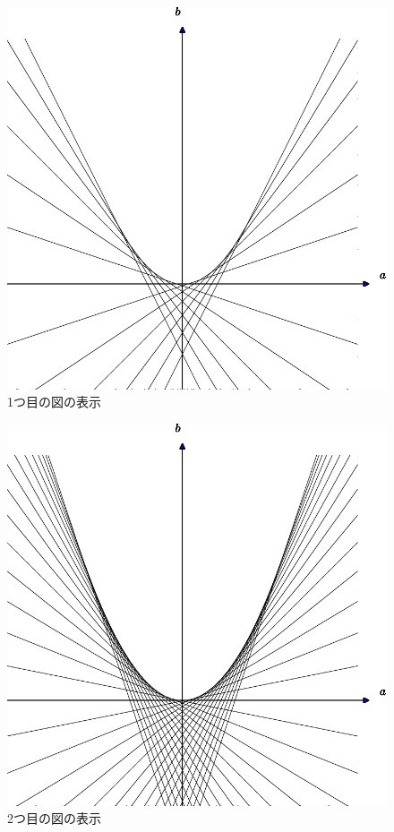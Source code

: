 \documentclass[11pt,a4j,fleqn]{jarticle}
\begin{document}
\begin{figure}
 \centering
 \includegraphics[scale=0.7]{envelope0.pdf}
 \caption{1つ目の図の表示}
 \label{fig:1}
\end{figure}

\begin{figure}
 \centering
 \includegraphics[scale=0.7]{envelope1.pdf}

 \caption{2つ目の図の表示}
 \label{fig:2}
\end{figure}
\end{document}
